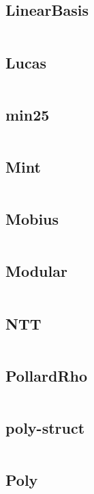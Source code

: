 \documentclass[a4]{article}
\begin{document}
\subsection{LinearBasis}
\inputminted[mathescape,linenos,numbersep=5pt,frame=lines,framesep=2mm]{cpp}{src/math/LinearBasis.cpp}
\subsection{Lucas}
\inputminted[mathescape,linenos,numbersep=5pt,frame=lines,framesep=2mm]{cpp}{src/math/Lucas.cpp}
\subsection{min25}
\inputminted[mathescape,linenos,numbersep=5pt,frame=lines,framesep=2mm]{cpp}{src/math/min25.cpp}
\subsection{Mint}
\inputminted[mathescape,linenos,numbersep=5pt,frame=lines,framesep=2mm]{cpp}{src/math/Mint.cpp}
\subsection{Mobius}
\inputminted[mathescape,linenos,numbersep=5pt,frame=lines,framesep=2mm]{cpp}{src/math/Mobius.cpp}
\subsection{Modular}
\inputminted[mathescape,linenos,numbersep=5pt,frame=lines,framesep=2mm]{cpp}{src/math/Modular.cpp}
\subsection{NTT}
\inputminted[mathescape,linenos,numbersep=5pt,frame=lines,framesep=2mm]{cpp}{src/math/NTT.cpp}
\subsection{PollardRho}
\inputminted[mathescape,linenos,numbersep=5pt,frame=lines,framesep=2mm]{cpp}{src/math/PollardRho.cpp}
\subsection{poly-struct}
\inputminted[mathescape,linenos,numbersep=5pt,frame=lines,framesep=2mm]{cpp}{src/math/poly-struct.cpp}
\subsection{Poly}
\inputminted[mathescape,linenos,numbersep=5pt,frame=lines,framesep=2mm]{cpp}{src/math/Poly.cpp}
\end{document}
